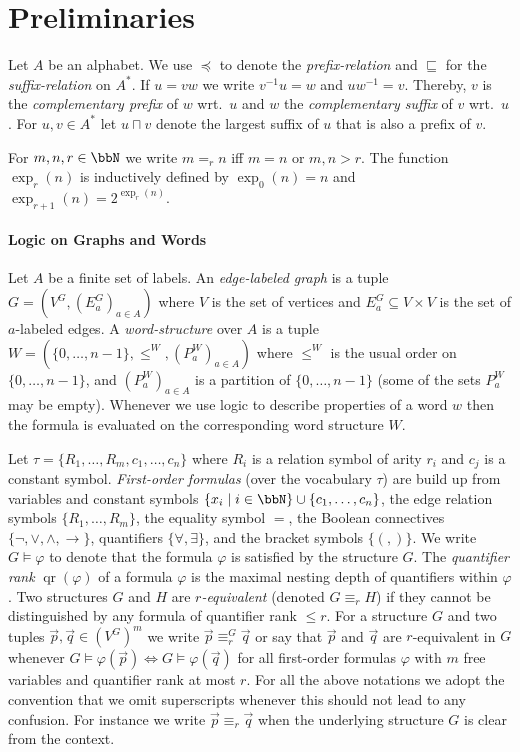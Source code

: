 \documentclass[a4paper,numberwithinsect,USenglish]{lipics-v2018}
\theoremstyle{plain}
\theoremstyle{remark}
\DeclareMathOperator{\qr}{qr}
\renewcommand{\phi}{\varphi}
\begin{document}
	\section{Preliminaries}
	Let $A$ be an alphabet. We use $\preceq$ to denote the \emph{prefix-relation} and $\sqsubseteq$ for the \emph{suffix-relation} on $A^\ast$. If $u= vw$ we write $v^{-1}u = w$ and
	$uw^{-1} = v$. Thereby, $v$ is the \emph{complementary prefix} of $w$ wrt.\ $u$ and $w$ the \emph{complementary suffix} of $v$ wrt.\ $u$. For $u,v\in A^\ast$ let $u \sqcap v$ denote the largest suffix of $u$ that is also a prefix of $v$.
	
	For $m,n,r\in\bbN$ we write $m =_r n$ iff $m=n$ or $m,n>r$. The function $\exp_{r}(n)$ is inductively defined by $\exp_0(n) = n$ and $\exp_{r+1}(n) = 2^{\exp_r(n)}$.
	
	\paragraph*{Logic on Graphs and Words}
	Let $A$ be a finite set of labels. An \emph{edge-labeled graph} is a tuple $G=(V^G,(E_a^G)_{a\in A})$ where $V$ is the set of vertices and $E_a^G \subseteq V\times V$ is the set of $a$-labeled edges. 
	A \emph{word-structure} over $A$ is a tuple $W = (\{0,\ldots, n-1\}, \leq^W, (P_a^W)_{a\in A})$ where $\leq^W$ is the usual order on $\{0,\ldots,n-1\}$, and $(P_a^W)_{a\in A}$ is a partition of $\{0,\ldots, n-1\}$ (some of the sets $P_a^W$ may be empty). Whenever we use logic to describe properties of a word $w$ then the formula is evaluated on the corresponding word structure $W$. 
	
	Let $\tau = \{R_1,\ldots,R_m, c_1, \ldots, c_n\}$ where $R_i$ is a relation symbol of arity $r_i$ and $c_j$ is a constant symbol.
	\emph{First-order formulas} (over the vocabulary $\tau$) are build up
	from variables and constant symbols $\{x_i \mid i\in \bbN \}\cup \{c_1,\ldots,c_n\}$, the edge relation symbols $\{R_1,\ldots, R_m\}$, the equality symbol $=$, the Boolean connectives
	$\{\lnot,\vee,\wedge, \to \}$,
	quantifiers $\{\forall, \exists \}$, and the bracket symbols
	$\{(,) \}$. 
	We write $G\models \phi$ to denote that the formula $\phi$ is satisfied by the structure $G$.
	The \emph{quantifier rank} $\qr(\phi)$ of a formula $\phi$
	is the maximal nesting depth of quantifiers within $\phi$. Two structures
	$G$ and $H$ are \emph{$r$-equivalent} (denoted $G\equiv_r H$) if they
	cannot be distinguished by any formula of quantifier rank $\le r$. 
	For a structure $G$ and two tuples $\vec{p}, \vec{q} \in (V^G)^m$ we write $\vec{p} \equiv_r^G \vec{q}$ or say that $\vec{p}$ and $\vec{q}$ are $r$-equivalent in $G$
	whenever $G\models \phi(\vec{p}) \Leftrightarrow G\models\phi(\vec{q})$ for all first-order formulas $\phi$ with $m$ free variables and
	quantifier rank at most $r$. For all the above notations we adopt the convention that we omit superscripts whenever this should not lead to any confusion. For instance we write 
	$\vec{p} \equiv_r \vec{q}$ when the underlying structure $G$ is clear from the context. 
	
\end{document}
